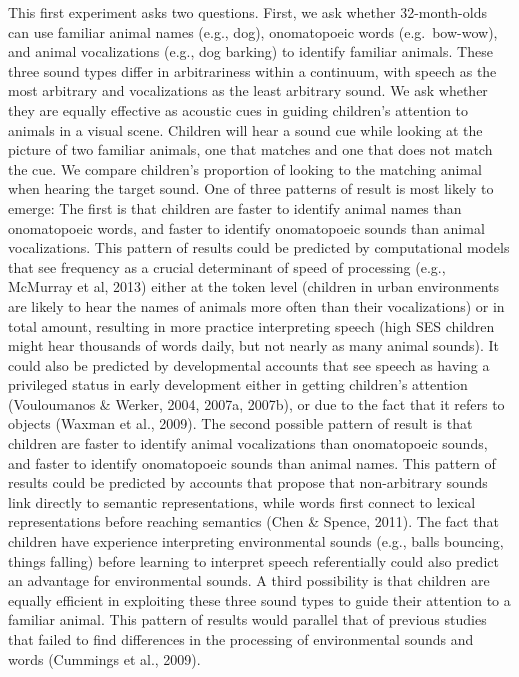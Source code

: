 \documentclass[english,floatsintext,man]{apa6}
\theoremstyle{definition}
\theoremstyle{definition}
\theoremstyle{definition}
\theoremstyle{remark}
\begin{document}
This first experiment asks two questions. First, we ask whether
32-month-olds can use familiar animal names (e.g., dog), onomatopoeic
words (e.g.~bow-wow), and animal vocalizations (e.g., dog barking) to
identify familiar animals. These three sound types differ in
arbitrariness within a continuum, with speech as the most arbitrary and
vocalizations as the least arbitrary sound. We ask whether they are
equally effective as acoustic cues in guiding children's attention to
animals in a visual scene. Children will hear a sound cue while looking
at the picture of two familiar animals, one that matches and one that
does not match the cue. We compare children's proportion of looking to
the matching animal when hearing the target sound. One of three patterns
of result is most likely to emerge: The first is that children are
faster to identify animal names than onomatopoeic words, and faster to
identify onomatopoeic sounds than animal vocalizations. This pattern of
results could be predicted by computational models that see frequency as
a crucial determinant of speed of processing (e.g., McMurray et al,
2013) either at the token level (children in urban environments are
likely to hear the names of animals more often than their vocalizations)
or in total amount, resulting in more practice interpreting speech (high
SES children might hear thousands of words daily, but not nearly as many
animal sounds). It could also be predicted by developmental accounts
that see speech as having a privileged status in early development
either in getting children's attention (Vouloumanos \& Werker, 2004,
2007a, 2007b), or due to the fact that it refers to objects (Waxman et
al., 2009). The second possible pattern of result is that children are
faster to identify animal vocalizations than onomatopoeic sounds, and
faster to identify onomatopoeic sounds than animal names. This pattern
of results could be predicted by accounts that propose that
non-arbitrary sounds link directly to semantic representations, while
words first connect to lexical representations before reaching semantics
(Chen \& Spence, 2011). The fact that children have experience
interpreting environmental sounds (e.g., balls bouncing, things falling)
before learning to interpret speech referentially could also predict an
advantage for environmental sounds. A third possibility is that children
are equally efficient in exploiting these three sound types to guide
their attention to a familiar animal. This pattern of results would
parallel that of previous studies that failed to find differences in the
processing of environmental sounds and words (Cummings et al., 2009).
\end{document}
